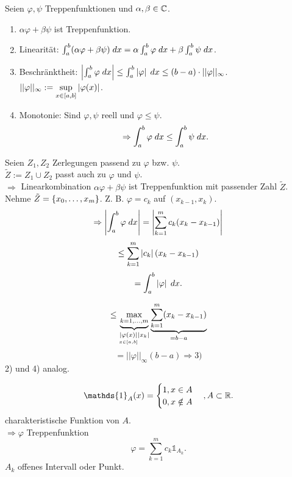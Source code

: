 \documentclass[../ana2.tex]{subfiles}
\begin{document}
\begin{lem}
    Seien \( \varphi, \psi \) Treppenfunktionen und 
    \( \alpha, \beta \in \C \).
    \begin{enumerate}
        \item \( \alpha \varphi + \beta \psi \) ist Treppenfunktion.
        \item Linearität: \( \integral{(\alpha \varphi + \beta \psi)}{a}{b} 
        = \alpha \integral{\varphi}{a}{b} 
        + \beta \integral{\psi}{a}{b} \).
        \item Beschränktheit: \( \abs{\integral{\varphi}{a}{b}}
        \leq \integral{\abs{\varphi}}{a}{b} \leq (b-a) \cdot ||\varphi||_\infty \). \\
        \( ||\varphi||_\infty 
        := \underset{x \in [a,b]}{\sup} \abs{\varphi(x)} \).
        \item Monotonie: Sind \( \varphi, \psi \) reell und 
        \( \varphi \leq \psi \).
        \[ \Rightarrow \integral{\varphi}{a}{b} 
        \leq \integral{\psi}{a}{b}. \]
    \end{enumerate}
\end{lem}
\begin{bew}
    Seien \( Z_1, Z_2 \) Zerlegungen passend zu \( \varphi \) bzw. 
    \( \psi \).\\
    \( \tilde{Z} := Z_1 \cup Z_2 \) passt auch zu \( \varphi \) und 
    \( \psi \).\\
    \( \Rightarrow \) Linearkombination \( \alpha \varphi + \beta \psi \) 
    ist Treppenfunktion mit passender Zahl \( \tilde{Z} \).\\
    Nehme \( \tilde{Z} = \set{x_0,\ldots, x_m} \).
    Z. B. \( \varphi = c_k \) auf \( (x_{k-1}, x_k) \).
    \[ \Rightarrow \abs{ \integral{\varphi}{a}{b} } 
    = \abs{\sum_{k=1}^m c_k (x_k - x_{k-1}) } \]
    \[ \leq \sum_{k=1}^m \abs{c_k} (x_k - x_{k-1}) \]
    \[ = \integral{\abs{\varphi}}{a}{b}. \]

    \[ \leq \underbrace{\underset{k=1,\dots,m}{\max}}
    _{\underset{x \in [a,b]}{\abs{\varphi(x)}} \abs{x_k}}
    \underbrace{\sum_{k=1}^m (x_k-x_{k-1})}_{=b-a} \]
    \[ = ||\varphi||_\infty (b-a) \Rightarrow \text{3)} \]
    2) und 4) analog.
\end{bew}
\begin{bem}
    \[ \mathds{1}_A (x) = \begin{cases}
        1, x \in A \\
        0, x \notin A
    \end{cases}, A\subset \R. \]
    charakteristische Funktion von \(A\).\\
    \( \Rightarrow \varphi \) Treppenfunktion
    \[ \varphi = \sum_{k=1}^m c_k \mathds{1}_{A_k}. \]
    \( A_k \) offenes Intervall oder Punkt.
\end{bem}
\end{document}
